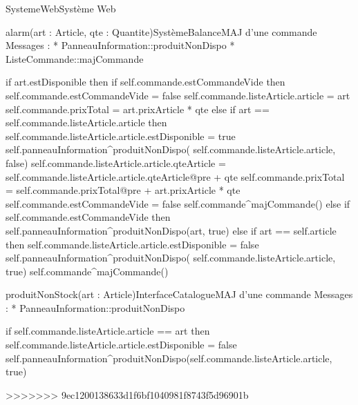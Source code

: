 \begin{OM}{SystemeWeb}{Système Web}
\begin{OMOperation}{alarm(art : Article, qte : Quantite)}{SystèmeBalance}{MAJ d'une commande}
Messages :
* PanneauInformation::{produitNonDispo}
* ListeCommande::{majCommande}
\begin{OMPre}
\end{OMPre}
\begin{OMPost}
        if art.estDisponible then
                if self.commande.estCommandeVide then
                        self.commande.estCommandeVide = false
self.commande.listeArticle.article = art
self.commande.prixTotal = art.prixArticle * qte
                else
                        if art == self.commande.listeArticle.article then
                                self.commande.listeArticle.article.estDisponible = true
                                self.panneauInformation^produitNonDispo(
self.commande.listeArticle.article, false)
                                self.commande.listeArticle.article.qteArticle =
self.commande.listeArticle.article.qteArticle@pre + qte
self.commande.prixTotal = self.commande.prixTotal@pre +
art.prixArticle * qte
                        self.commande.estCommandeVide = false
                self.commande^majCommande()
        else
                if self.commande.estCommandeVide then
                        self.panneauInformation^produitNonDispo(art, true)
                else
if art == self.article then
        self.commande.listeArticle.article.estDisponible = false
                                self.panneauInformation^produitNonDispo(
self.commande.listeArticle.article, true)
                self.commande^majCommande()
            \end{OMPost}
\end{OMOperation}

\begin{OMOperation}{produitNonStock(art : Article)}{InterfaceCatalogue}{MAJ d'une commande}
Messages :
* PanneauInformation::{produitNonDispo}
\begin{OMPre}
\end{OMPre}
\begin{OMPost}
        if self.commande.listeArticle.article == art then
                self.commande.listeArticle.article.estDisponible = false
                self.panneauInformation^produitNonDispo(self.commande.listeArticle.article, true)
            \end{OMPost}
\end{OMOperation}
>>>>>>> 9ec1200138633d1f6bf1040981f8743f5d96901b


\end{OM}
